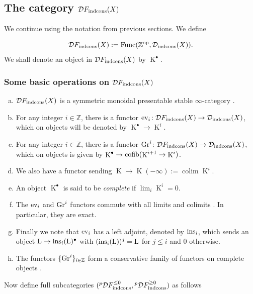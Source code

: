 \documentclass[12pt, reqno]{amsart}
\theoremstyle{plain}
\theoremstyle{definition}
\theoremstyle{definition}
\newcommand{\bbZ}{{\mathbb Z}}
\newcommand{\cD}{{\mathcal D}}
\DeclareMathOperator{\KK}{K}
\DeclareMathOperator{\colim}{\mathrm{colim}}
\begin{document}
\subsection{The category $\cD F_{\textup{indcons}}(X)$}
We continue using the notation from previous sections. We define 

\[
\cD F_{\textup{indcons}}(X):=\textup{Func}(\bbZ^{\textup{op}},\cD_{\textup{indcons}}(X)).
\]
We shall denote an object in $\cD F_{\textup{indcons}}(X)$ by $\KK^{\bullet}$.
\subsubsection{Some basic operations on $\cD F_{\textup{indcons}}(X)$}\label{operations_Filtered}
\begin{enumerate}[(a)]
    \item $\cD F_{\textup{indcons}}(X)$ is a symmetric monoidal presentable stable $\infty$-category \cite[\S 2.23]{GP18}.
    \item For any integer $i \in \bbZ$, there is a functor $\textup{ev}_{i} \colon \cD F_{\textup{indcons}}(X) \to \cD_{\textup{indcons}}(X)$, which on objects will be denoted by $\KK^{\bullet} \to \KK^i$.
    \item For any integer $i \in \bbZ$, there is a functor $\textup{Gr}^{i} \colon \cD F_{\textup{indcons}}(X) \to \cD_{\textup{indcons}}(X)$, which on objects is given by $\KK^{\bullet} \to \textup{cofib}(\KK^{i+1} \to \KK^{i})$.
    \item We also have a functor sending $\KK \to \KK(-\infty):=\colim \KK^{i}$.
    \item An object $\KK^{\bullet}$ is said to be \textit{complete} if $\lim_i \KK^{i}=0$.
    \item The $\textup{ev}_{i}$ and $\textup{Gr}^{i}$ functors commute with all limits and colimits \cite[\S 2]{GP18}. In particular, they are exact.
    \item Finally we note that $\textup{ev}_i$ has a left adjoint, denoted by $\textup{ins}_{i}$, which sends an object $\mathrm{L} \to \textup{ins}_{i}(\mathrm{L})^{\bullet}$ with $(\textup{ins}_{i}(\mathrm{L}))^{j}=\mathrm{L}$ for $j \leq i$ and $0$ otherwise. 
    \item The functors $\{\textup{Gr}^{i}\}_{i \in \bbZ}$ form a conservative family of functors on complete objects \cite[\S 2.7]{GP18}.
    
\end{enumerate}

Now define full subcategories $({}^p\cD F_{\textup{indcons}}^{\leq 0},{}^p\cD F_{\textup{indcons}}^{\geq 0})$ as follows
\end{document}

